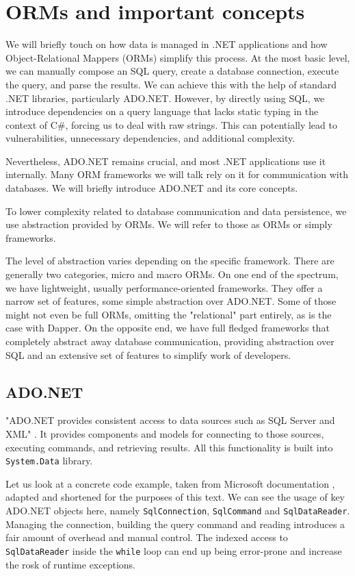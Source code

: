 \section{ORMs and important concepts}

We will briefly touch on how data is managed in .NET applications and how Object-Relational Mappers (ORMs) simplify this process.
At the most basic level, we can manually compose an SQL query, create a database connection, execute the query, and parse the results. We can achieve this with the help of standard .NET libraries, particularly ADO.NET. However, by directly using SQL, we introduce dependencies on a query language that lacks static typing in the context of C\#, forcing us to deal with raw strings. This can potentially lead to vulnerabilities, unnecessary dependencies, and additional complexity.

Nevertheless, ADO.NET remains crucial, and most .NET applications use it internally. Many ORM frameworks we will talk rely on it for communication with databases. We will briefly introduce ADO.NET and its core concepts.

To lower complexity related to database communication and data persistence, we use abstraction provided by ORMs. We will refer to those as ORMs or simply frameworks.

The level of abstraction varies depending on the specific framework. There are generally two categories, micro and macro ORMs. On one end of the spectrum, we have lightweight, usually performance-oriented frameworks. They offer a narrow set of features, some simple abstraction over ADO.NET. Some of those might not even be full ORMs, omitting the "relational" part entirely, as is the case with Dapper\cite{Dapper}. On the opposite end, we have full fledged frameworks that completely abstract away database communication, providing abstraction over SQL and an extensive set of features to simplify work of developers. \cite{Dapper}

\subsection{ADO.NET}
"ADO.NET provides consistent access to data sources such as SQL Server and XML" \cite{ADONET}. It provides components and models for connecting to those sources, executing commands, and retrieving results. All this functionality is built into \texttt{System.Data} library.

Let us look at a concrete code example, taken from Microsoft documentation \cite{ADONET}, adapted and shortened for the purposes of this text.
We can see the usage of key ADO.NET objects here, namely \texttt{SqlConnection}, \texttt{SqlCommand} and \texttt{SqlDataReader}. Managing the connection, building the query command and reading introduces a fair amount of overhead and manual control. The indexed access to \texttt{SqlDataReader} inside the \texttt{while} loop can end up being error-prone and increase the rosk of runtime exceptions. 

